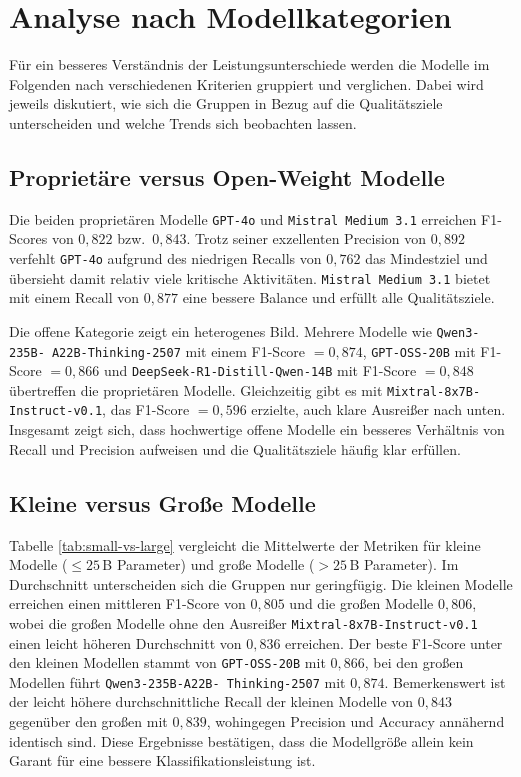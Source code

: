 \section{Analyse nach Modellkategorien}\label{sec:analyse-nach-modellkategorien}

Für ein besseres Verständnis der Leistungsunterschiede werden die Modelle im Folgenden nach verschiedenen Kriterien gruppiert und verglichen. Dabei wird jeweils diskutiert, wie sich die Gruppen in Bezug auf die Qualitätsziele unterscheiden und welche Trends sich beobachten lassen.

\subsection*{Proprietäre versus Open-Weight Modelle}

Die beiden proprietären Modelle \texttt{GPT-4o} und \texttt{Mistral Medium 3.1} erreichen F1-Scores von $0{,}822$ bzw.\ $0{,}843$. Trotz seiner exzellenten Precision von $0{,}892$ verfehlt \texttt{GPT-4o} aufgrund des niedrigen Recalls von $0{,}762$ das Mindestziel und übersieht damit relativ viele kritische Aktivitäten. \texttt{Mistral Medium 3.1} bietet mit einem Recall von $0{,}877$ eine bessere Balance und erfüllt alle Qualitätsziele.

Die offene Kategorie zeigt ein heterogenes Bild. Mehrere Modelle wie \texttt{Qwen3-235B-\linebreak~A22B-Thinking-2507} mit einem F1-Score $= 0{,}874$, \texttt{GPT-OSS-20B} mit F1-Score $= 0{,}866$ und \texttt{DeepSeek-R1-Distill-Qwen-14B} mit F1-Score $= 0{,}848$ übertreffen die proprietären Modelle. Gleichzeitig gibt es mit \texttt{Mixtral-8x7B-Instruct-v0.1}, das F1-Score $= 0{,}596$ erzielte, auch klare Ausreißer nach unten. Insgesamt zeigt sich, dass hochwertige offene Modelle ein besseres Verhältnis von Recall und Precision aufweisen und die Qualitätsziele häufig klar erfüllen.

\subsection*{Kleine versus Große Modelle}

Tabelle \ref{tab:small-vs-large} vergleicht die Mittelwerte der Metriken für kleine Modelle ($\leq 25$\,B Parameter) und große Modelle ($>25$\,B Parameter). Im Durchschnitt unterscheiden sich die Gruppen nur geringfügig. Die kleinen Modelle erreichen einen mittleren F1-Score von $0{,}805$ und die großen Modelle $0{,}806$, wobei die großen Modelle ohne den Ausreißer \texttt{Mixtral-8x7B-Instruct-v0.1} einen leicht höheren Durchschnitt von $0{,}836$ erreichen. Der beste F1-Score unter den kleinen Modellen stammt von \texttt{GPT-OSS-20B} mit $0{,}866$, bei den großen Modellen führt \texttt{Qwen3-235B-A22B-\linebreak~Thinking-2507} mit $0{,}874$. Bemerkenswert ist der leicht höhere durchschnittliche Recall der kleinen Modelle von $0{,}843$ gegenüber den großen mit $0{,}839$, wohingegen Precision und Accuracy annähernd identisch sind. Diese Ergebnisse bestätigen, dass die Modellgröße allein kein Garant für eine bessere Klassifikationsleistung ist.

